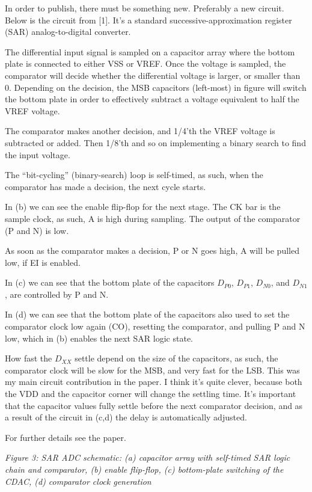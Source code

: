In order to publish, there must be something new. Preferably a new
circuit. Below is the circuit from {[}1{]}. It's a standard
successive-approximation register (SAR) analog-to-digital converter.

The differential input signal is sampled on a capacitor array where the
bottom plate is connected to either VSS or VREF. Once the voltage is
sampled, the comparator will decide whether the differential voltage is
larger, or smaller than 0. Depending on the decision, the MSB capacitors
(left-most) in figure will switch the bottom plate in order to
effectively subtract a voltage equivalent to half the VREF voltage.

The comparator makes another decision, and 1/4'th the VREF voltage is
subtracted or added. Then 1/8'th and so on implementing a binary search
to find the input voltage.

The ``bit-cycling'' (binary-search) loop is self-timed, as such, when
the comparator has made a decision, the next cycle starts.

In (b) we can see the enable flip-flop for the next stage. The CK bar is
the sample clock, as such, A is high during sampling. The output of the
comparator (P and N) is low.

As soon as the comparator makes a decision, P or N goes high, A will be
pulled low, if EI is enabled.

In (c) we can see that the bottom plate of the capacitors \(D_{P0}\),
\(D_{P1}\), \(D_{N0}\), and \(D_{N1}\), are controlled by P and N.

In (d) we can see that the bottom plate of the capacitors also used to
set the comparator clock low again (CO), resetting the comparator, and
pulling P and N low, which in (b) enables the next SAR logic state.

How fast the \(D_{XX}\) settle depend on the size of the capacitors, as
such, the comparator clock will be slow for the MSB, and very fast for
the LSB. This was my main circuit contribution in the paper. I think
it's quite clever, because both the VDD and the capacitor corner will
change the settling time. It's important that the capacitor values fully
settle before the next comparator decision, and as a result of the
circuit in (c,d) the delay is automatically adjusted.

For further details see the paper.


{
\centering
{}
}

\emph{Figure 3: SAR ADC schematic: (a) capacitor array with self-timed
SAR logic chain and comparator, (b) enable flip-flop, (c) bottom-plate
switching of the CDAC, (d) comparator clock generation}

